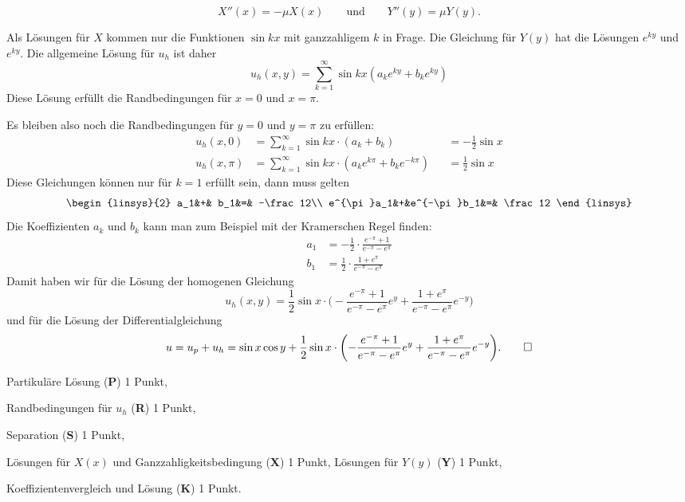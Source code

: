 \begin{loesung}
\begin{teilaufgaben}
\[
X''(x) = -\mu X(x)
\qquad\text{und}\qquad
Y''(y) = \mu Y(y).
\]
\item
Als Lösungen für $X$ kommen nur die Funktionen 
$\sin kx$ mit ganzzahligem $k$ in Frage.
Die Gleichung für $Y(y)$ hat die Lösungen $e^{ky}$ und $e^{ky}$.
Die allgemeine Lösung für $u_h$ ist daher
\[
u_h(x,y)
=
\sum_{k=1}^\infty \sin kx (a_k e^{ky} + b_k e^{ky})
\]
Diese Lösung erfüllt die Randbedingungen für $x=0$ und $x=\pi$.
\item
Es bleiben also noch die Randbedingungen für $y=0$ und $y=\pi$ zu erfüllen:
\begin{equation}
\begin{aligned}
u_h(x,0)   &= \sum_{k=1}^\infty \sin kx \cdot (a_k + b_k)&&=-\frac12\sin x
\\
u_h(x,\pi) &= \sum_{k=1}^\infty \sin kx \cdot (a_ke^{k\pi} + b_ke^{-k\pi}) &&=\frac12\sin x
\end{aligned}
\end{equation}
Diese Gleichungen können nur für $k=1$ erfüllt sein, dann muss gelten
\begin{equation}
\begin{linsys}{2}
       a_1&+&        b_1&=& -\frac12\\
e^{\pi}a_1&+&e^{-\pi}b_1&=&  \frac12
\end{linsys}
\end{equation}
Die Koeffizienten $a_k$ und $b_k$ kann man zum Beispiel mit der Kramerschen
Regel finden:
\begin{align*}
a_1
&=
-\frac12\cdot
\frac{e^{-\pi}+1}{e^{-\pi}-e^{\pi}}
\\
b_1
&=
\frac12\cdot
\frac{1+e^{\pi}}{e^{-\pi}-e^{\pi}}
\end{align*}
Damit haben wir für die Lösung der homogenen Gleichung
\[
u_h(x,y)
=
\frac12
\sin x \cdot \biggl(
-
\frac{e^{-\pi}+1}{e^{-\pi}-e^{\pi}} e^y
+
\frac{1+e^{\pi}}{e^{-\pi}-e^{\pi}} e^{-y}
\biggr)
\]
und für die Lösung der Differentialgleichung
\[
u
=
u_p + u_h
=
\sin x \cos y
+
\frac12
\sin x \cdot \biggl(
-
\frac{e^{-\pi}+1}{e^{-\pi}-e^{\pi}} e^y
+
\frac{1+e^{\pi}}{e^{-\pi}-e^{\pi}} e^{-y}
\biggr).
\qedhere
\]
\end{teilaufgaben}
\end{loesung}

\begin{bewertung}
\begin{teilaufgaben}
\item
Partikuläre Lösung ({\bf P}) 1 Punkt,
\item
Randbedingungen für $u_h$ ({\bf R}) 1 Punkt,
\item
Separation ({\bf S}) 1 Punkt,
\item
Lösungen für $X(x)$ und Ganzzahligkeitsbedingung ({\bf X}) 1 Punkt,
Lösungen für $Y(y)$ ({\bf Y}) 1 Punkt,
\item
Koeffizientenvergleich und Lösung ({\bf K}) 1 Punkt.
\end{teilaufgaben}
\end{bewertung}




